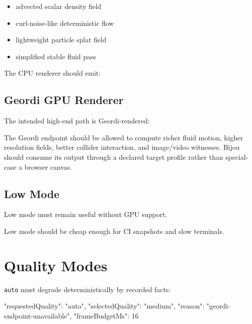 \begin{itemize}
\tightlist
\item
  advected scalar density field
\item
  curl-noise-like deterministic flow
\item
  lightweight particle splat field
\item
  simplified stable fluid pass
\end{itemize}

The CPU renderer should emit:



\subsection{Geordi GPU Renderer}\label{record-114-geordi-gpu-renderer}

The intended high-end path is Geordi-rendered:



The Geordi endpoint should be allowed to compute richer fluid motion, higher resolution fields, better collider interaction, and image/video witnesses. Bijou should consume its output through a declared target profile rather than special-case a browser canvas.

\subsection{Low Mode}\label{record-114-low-mode}

Low mode must remain useful without GPU support.



Low mode should be cheap enough for CI snapshots and slow terminals.

\section{Quality Modes}\label{record-114-quality-modes}



\texttt{a\allowbreak{}u\allowbreak{}t\allowbreak{}o} must degrade deterministically by recorded facts:

\begin{CodeBlock}
{
  "requestedQuality": "auto",
  "selectedQuality": "medium",
  "reason": "geordi-endpoint-unavailable",
  "frameBudgetMs": 16
}
\end{CodeBlock}

